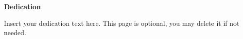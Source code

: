

\begin{center}

\vspace*{5\baselineskip}
\textbf{\large Dedication}
\end{center}


\begin{flushleft}
\hspace{10mm}Insert your dedication text here. This page is optional, you may delete it if not needed. 
\end{flushleft}




